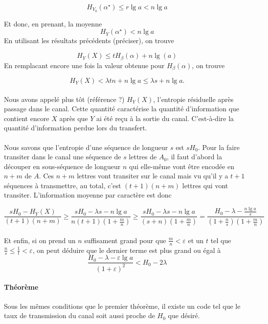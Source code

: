 	\[H_{Y_0}(\alpha^\star) \le r\lg a < n\lg a\]
	
	Et donc, en prenant, la moyenne 
	\[H_Y(\alpha^\star) < n \lg a\]
	En utilisant les résultats précédents (préciser), on trouve
	
	\[H_Y(X)\le t H_\beta(\alpha) + n \lg(a)\]
	En remplacant encore une fois la valeur obtenue pour $H_\beta(\alpha)$, on trouve
	
	\[H_Y(X)<\lambda t n + n \lg a \le \lambda s+n \lg a.\]
	
	\paragraph{}
	Nous avons appelé plus tôt (référence ?) $H_Y(X)$, l'entropie résiduelle après passage dans le canal. Cette quantité caractérise la quantité d'information
	que contient encore $X$ après que $Y$ ai été reçu à la sortie du canal. C'est-à-dire la quantité d'information perdue lors du transfert.
	
	\paragraph{}
	Nous savons que l'entropie d'une séquence de longueur $s$ est $sH_0$. Pour la faire transiter dans le canal une séquence de $s$ lettres de $A_0$, il faut d'abord la découper en sous-séquence de 
	longueur $n$ qui elle-même vont être encodée en $n+m$ de $A$. Ces $n+m$ lettres vont transiter sur le canal mais vu qu'il y a $t+1$ séquences à transmettre,
	au total, c'est $(t+1)(n+m)$ lettres qui vont transiter. L'information moyenne par caractère est donc
	
	\[\frac{sH_0-H_Y(X)}{(t+1)(n+m)} \ge \frac{sH_0-\lambda s-n\lg a}{n(t+1)(1+\frac{m}{n})} \ge 
	\frac{sH_0-\lambda s-n\lg a}{(s+n)(1+\frac{m}{n})} = \frac{H_0-\lambda-\frac{n\lg a}{s}}{(1+\frac{n}{s})(1+\frac{m}{n})}\]
	
	\paragraph{}
	Et enfin, si on prend un $n$ suffisament grand pour que $\frac{m}{n}<\varepsilon$ et un $t$ tel que $\frac{n}{s} \le \frac{1}{t} < \varepsilon$, on peut 
	déduire que le dernier terme est plus grand ou égal à
	\[\frac{H_0-\lambda-\varepsilon\lg a}{(1+\varepsilon)^2}<H_0-2\lambda\]
	
	
	
	
	
	
	
	
	\paragraph{Théorème}
	Sous les mêmes conditions que le premier théorème, il existe un code tel que le taux de transmission du canal soit aussi proche de $H_0$ que désiré.

